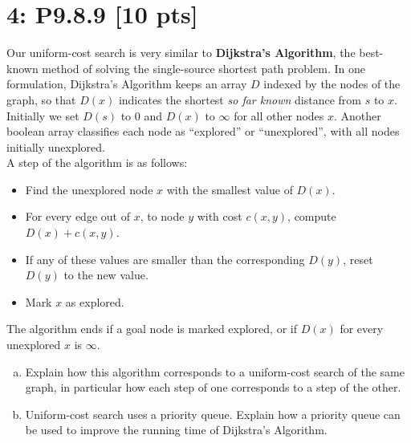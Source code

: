 \documentclass[12pt]{article}
\begin{document}
\section*{\textbf{4: P9.8.9} [10 pts]}
Our uniform-cost search is very similar to \textbf{Dijkstra’s Algorithm}, the best-known method of solving the single-source shortest path problem. In one formulation, Dijkstra’s Algorithm keeps an array $D$ indexed by the nodes of the graph, so that $D(x)$ indicates the shortest \textit{so far known} distance from $s$ to $x$. Initially we set $D(s)$ to 0 and $D(x)$ to $\infty$ for all other nodes $x$. Another boolean array classifies each node as “explored” or “unexplored”, with all nodes initially unexplored. \\
A step of the algorithm is as follows: 
\begin{itemize}
    \item Find the unexplored node $x$ with the smallest value of $D(x)$.

    \item  For every edge out of $x$, to node $y$ with cost $c(x, y)$, compute $D(x) + c(x, y)$.

    \item If any of these values are smaller than the corresponding $D(y)$, reset $D(y)$ to the new value.

    \item Mark $x$ as explored.

\end{itemize}
The algorithm ends if a goal node is marked explored, or if $D(x)$ for every unexplored $x$ is $\infty$.

\begin{enumerate}[(a)]
    \item Explain how this algorithm corresponds to a uniform-cost search of the same graph, in particular how each step of one corresponds to a step of the other.

    \item Uniform-cost search uses a priority queue. Explain how a priority queue can be used to improve the running time of Dijkstra’s Algorithm.
\end{enumerate}
\end{document}

